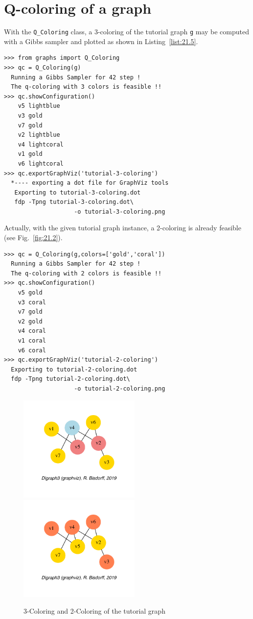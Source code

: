 \section{Q-coloring of a graph}
\label{25.2}

With the \texttt{Q\_Coloring} class, a 3-coloring of the tutorial graph \texttt{g} may be computed with a Gibbs sampler \citep{GEM-1984} and plotted as shown in Listing~\vref{list:21.5}.
\begin{lstlisting}[caption={Computing a 3-coloring of the random graph \texttt{g}},label=list:21.5]
>>> from graphs import Q_Coloring
>>> qc = Q_Coloring(g)
  Running a Gibbs Sampler for 42 step !
  The q-coloring with 3 colors is feasible !!
>>> qc.showConfiguration()
    v5 lightblue
    v3 gold
    v7 gold
    v2 lightblue
    v4 lightcoral
    v1 gold
    v6 lightcoral
>>> qc.exportGraphViz('tutorial-3-coloring')
  *---- exporting a dot file for GraphViz tools
   Exporting to tutorial-3-coloring.dot
   fdp -Tpng tutorial-3-coloring.dot\
                    -o tutorial-3-coloring.png
\end{lstlisting}

Actually, with the given tutorial graph instance, a 2-coloring is already feasible (see Fig.~\vref{fig:21.2}).
\begin{lstlisting}
>>> qc = Q_Coloring(g,colors=['gold','coral'])
  Running a Gibbs Sampler for 42 step !
  The q-coloring with 2 colors is feasible !!
>>> qc.showConfiguration()
    v5 gold
    v3 coral
    v7 gold
    v2 gold
    v4 coral
    v1 coral
    v6 coral
>>> qc.exportGraphViz('tutorial-2-coloring')
  Exporting to tutorial-2-coloring.dot
  fdp -Tpng tutorial-2-coloring.dot\
                    -o tutorial-2-coloring.png
\end{lstlisting}
\begin{figure}[h]
\sidecaption[t]
\includegraphics[width=6cm]{Figures/21-2-tutorial-3-coloring.pdf}\hfill
\includegraphics[width=6cm]{Figures/21-2-tutorial-2-coloring.pdf}
\caption{3-Coloring and 2-Coloring of the tutorial graph} 
\label{fig:21.2}       %
\end{figure}

